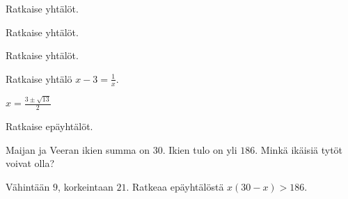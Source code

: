 \begin{multicols}{2}

\begin{tehtava} 
Ratkaise yhtälöt.
    \begin{vastaus}
    \end{vastaus}
\end{tehtava}

\begin{tehtava}
    Ratkaise yhtälöt.
    \begin{vastaus}
    \end{vastaus}
\end{tehtava}

\begin{tehtava}
    Ratkaise yhtälöt.
    \begin{vastaus}
    \end{vastaus}
\end{tehtava}

\begin{tehtava}
Ratkaise yhtälö $x - 3 = \frac{1}{x}$.
    \begin{vastaus}
    $x =\frac{3 \pm \sqrt{13}}{2}$
    \end{vastaus}
\end{tehtava}

\begin{tehtava} 
Ratkaise epäyhtälöt.
    \begin{vastaus}
    \end{vastaus}
\end{tehtava}

\begin{tehtava} 
Maijan ja Veeran ikien summa on $30$. Ikien tulo on yli $186$. Minkä ikäisiä tytöt voivat olla?
    \begin{vastaus}
	Vähintään $9$, korkeintaan $21$. Ratkeaa epäyhtälöstä $x(30-x)>186$.
	\end{vastaus}
\end{tehtava}


\end{multicols}
